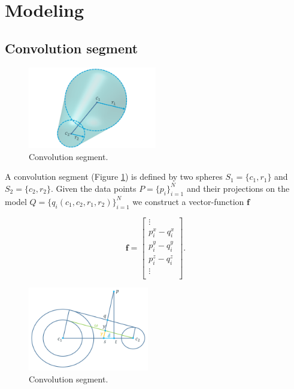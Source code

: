 \section{Modeling}


\subsection{Convolution segment}

\begin{figure}[h!] 
	\centering
	\includegraphics[width=0.5\textwidth]{fig/old/convsegment.png}
	\caption{Convolution segment.}
	\label{fig:convsegment}
\end{figure}

A convolution segment (Figure \ref{fig:convsegment}) is defined by two spheres $S_1 = \{c_1, r_1\}$ and $S_2 = \{c_2, r_2\}$.
Given the data points $P = \{p_i\}_{i = 1}^N$ and their projections on the model  $Q = \{q_i(c_1, c_2, r_1, r_2)\}_{i = 1}^N$  we construct a vector-function $\textbf{f}$ 

 \begin{equation}
 	\textbf{f} = \left[
 		\begin{array}{c}
 			\vdots \\
			p_i^x - q_i^x\\
			p_i^y - q_i^y\\
			p_i^z - q_i^z\\
			\vdots \\
	\end{array}
 	\right].
 \end{equation} 

\begin{figure}[h!] 
	\centering
	\hspace{-2em}
	\includegraphics[width=0.47\textwidth]{fig/corresp/projection_convsegment.png}
	\caption{Convolution segment.}
	\label{fig:projection_convsegment}
\end{figure}

